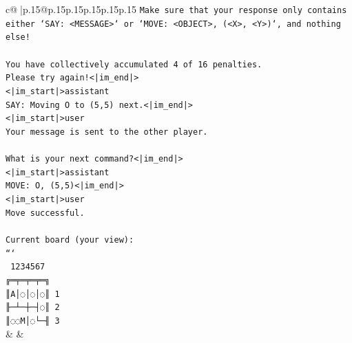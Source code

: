 \documentclass{article}
\begin{document}
{\begin{supertabular}{c@{$\;$}|p{.15\linewidth}@{}p{.15\linewidth}p{.15\linewidth}p{.15\linewidth}p{.15\linewidth}p{.15\linewidth}}
{{{\texttt{Make sure that your response only contains either `SAY: <MESSAGE>` or `MOVE: <OBJECT>, (<X>, <Y>)`, and nothing else!} \\
\\ 
\texttt{You have collectively accumulated 4 of 16 penalties.} \\
\texttt{Please try again!<|im\_end|>} \\
\texttt{<|im\_start|>assistant} \\
\texttt{SAY: Moving O to (5,5) next.<|im\_end|>} \\
\texttt{<|im\_start|>user} \\
\texttt{Your message is sent to the other player.} \\
\\ 
\texttt{What is your next command?<|im\_end|>} \\
\texttt{<|im\_start|>assistant} \\
\texttt{MOVE: O, (5,5)<|im\_end|>} \\
\texttt{<|im\_start|>user} \\
\texttt{Move successful.} \\
\\ 
\texttt{Current board (your view):} \\
\texttt{```} \\
\texttt{ 1234567} \\
\texttt{╔═╤═╤═╤═╗} \\
\texttt{║A│◌│◌│◌║ 1} \\
\texttt{╟─┴─┼─┤◌║ 2} \\
\texttt{║◌◌M│◌└─╢ 3} \\
            }
        }
    }
    & & \\ \\


\end{supertabular}}
\end{document}
